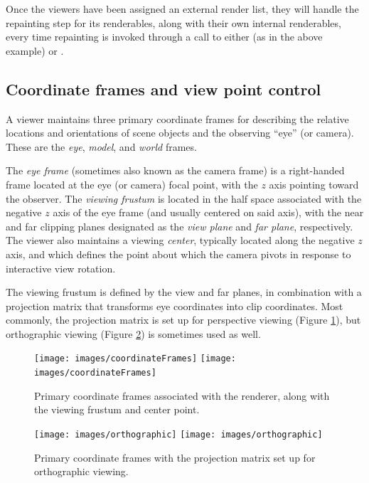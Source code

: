 Once the viewers have been assigned an external render list, they will
handle the repainting step for its renderables, along with their own
internal renderables, every time repainting is invoked through a call
to either  (as in the
above example) or .

\subsection{Coordinate frames and view point control}
\label{coordinateFrames:sec}

A viewer maintains three primary coordinate frames for describing the
relative locations and orientations of scene objects and the observing
``eye'' (or camera). These are the {\it eye}, {\it model}, and {\it
world} frames.

The {\it eye frame} (sometimes also known as the camera frame) is a
right-handed frame located at the eye (or camera) focal point, with
the $z$ axis pointing toward the observer. The {\it viewing frustum}
is located in the half space associated with the negative $z$ axis of
the eye frame (and usually centered on said axis), with the near and
far clipping planes designated as the {\it view plane} and {\it far
plane}, respectively. The viewer also maintains a viewing {\it
center}, typically located along the negative $z$ axis, and which
defines the point about which the camera pivots in response to
interactive view rotation.

The viewing frustum is defined by the view and far planes, in
combination with a projection matrix that transforms eye coordinates
into clip coordinates. Most commonly, the projection matrix is set up
for perspective viewing (Figure \ref{coordinateFrames:fig}), but
orthographic viewing (Figure \ref{orthographic:fig}) is sometimes used as
well.

%
\begin{figure}[t]
\begin{center}
\iflatexml
 \texttt{[image: images/coordinateFrames]}
\else
 \texttt{[image: images/coordinateFrames]}
\fi
\end{center}
\caption{Primary coordinate frames associated with the renderer, along with
the viewing frustum and center point.}
\label{coordinateFrames:fig}
\end{figure}
%

%
\begin{figure}[t]
\begin{center}
\iflatexml
 \texttt{[image: images/orthographic]}
\else
 \texttt{[image: images/orthographic]}
\fi
\end{center}
\caption{Primary coordinate frames with the projection matrix set up
for orthographic viewing.}
\label{orthographic:fig}
\end{figure}
%

